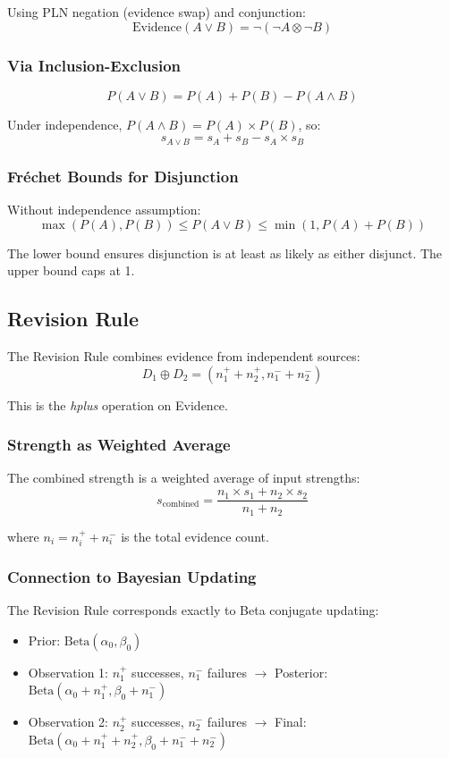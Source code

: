 \documentclass[]{article}
\begin{document}
Using PLN negation (evidence swap) and conjunction:
$$\text{Evidence}(A \lor B) = \neg(\neg A \otimes \neg B)$$

\subsubsection{Via Inclusion-Exclusion}
$$P(A \lor B) = P(A) + P(B) - P(A \land B)$$

Under independence, $P(A \land B) = P(A) \times P(B)$, so:
$$s_{A\lor B} = s_A + s_B - s_A \times s_B$$

\subsubsection{Fr\'{e}chet Bounds for Disjunction}
Without independence assumption:
$$\max(P(A), P(B)) \leq P(A \lor B) \leq \min(1, P(A) + P(B))$$

The lower bound ensures disjunction is at least as likely as either
disjunct.  The upper bound caps at 1.

\subsection{Revision Rule}
\label{sec:revision}
The Revision Rule combines evidence from independent sources:
$$D_1 \oplus D_2 = (n^+_1 + n^+_2, n^-_1 + n^-_2)$$

This is the \emph{hplus} operation on Evidence.

\subsubsection{Strength as Weighted Average}
The combined strength is a weighted average of input strengths:
$$s_{\text{combined}} = \frac{n_1 \times s_1 + n_2 \times s_2}{n_1 + n_2}$$

where $n_i = n^+_i + n^-_i$ is the total evidence count.

\subsubsection{Connection to Bayesian Updating}
The Revision Rule corresponds exactly to Beta conjugate updating:
\begin{itemize}
\item Prior: $\text{Beta}(\alpha_0, \beta_0)$
\item Observation 1: $n^+_1$ successes, $n^-_1$ failures $\to$ Posterior:
  $\text{Beta}(\alpha_0 + n^+_1, \beta_0 + n^-_1)$
\item Observation 2: $n^+_2$ successes, $n^-_2$ failures $\to$ Final:
  $\text{Beta}(\alpha_0 + n^+_1 + n^+_2, \beta_0 + n^-_1 + n^-_2)$
\end{itemize}
\end{document}
